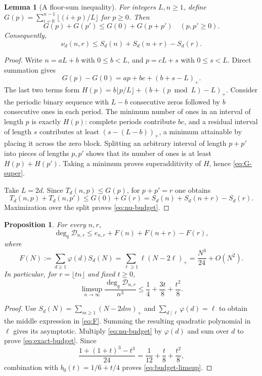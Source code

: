 \documentclass[11pt]{article}
\numberwithin{equation}{section}
\newtheorem{proposition}[proposition]{Proposition}
\newtheorem{lemma}[lemma]{Lemma}
\theoremstyle{definition}
\theoremstyle{remark}
\newcommand{\degq}{\operatorname{deg}_q}
\newcommand{\DD}{\mathcal{D}}
\begin{document}
\begin{lemma}[A floor-sum inequality]\label{lem:floor}
For integers $L,n\ge1$, define $G(p)=\sum_{i=0}^{n-1}\lfloor(i+p)/L\rfloor$
for $p\ge0$. Then
\begin{equation}\label{eq:G-super}
 G(p)+G(p')\le G(0)+G(p+p')\quad(p,p'\ge0).
\end{equation}
Consequently,
\begin{equation}\label{eq:nu-budget}
 \nu_d(n,r)\le S_d(n)+S_d(n+r)-S_d(r).
\end{equation}
\end{lemma}
\begin{proof}
Write $n=aL+b$ with $0\le b<L$, and $p=cL+s$ with $0\le s<L$.
Direct summation gives
\[
 G(p)-G(0)=ap+bc+(b+s-L)_+.
\]
The last two terms form
$H(p)=b\lfloor p/L\rfloor+(b+(p\bmod L)-L)_+$.
Consider the periodic binary sequence with $L-b$ consecutive zeros followed
by $b$ consecutive ones in each period. The minimum number of ones in an
interval of length $p$ is exactly $H(p)$: complete periods contribute $bc$,
and a residual interval of length $s$ contributes at least
$(s-(L-b))_+$, a minimum attainable by placing it across the zero block.
Splitting an arbitrary interval of length $p+p'$ into pieces of lengths
$p,p'$ shows that its number of ones is at least $H(p)+H(p')$.
Taking a minimum proves superadditivity of $H$, hence \eqref{eq:G-super}.

Take $L=2d$. Since $T_d(n,p)\le G(p)$, for $p+p'=r$ one obtains
\[
 T_d(n,p)+T_d(n,p')\le G(0)+G(r)
 =S_d(n)+S_d(n+r)-S_d(r).
\]
Maximization over the split proves \eqref{eq:nu-budget}.
\end{proof}

\begin{proposition}\label{prop:budget}
For every $n,r$,
\begin{equation}\label{eq:exact-budget}
 \degq\DD_{n,r}\le e_{n,r}+F(n)+F(n+r)-F(r),
\end{equation}
where
\begin{equation}\label{eq:F}
 F(N):=\sum_{d\ge1}\varphi(d)S_d(N)
 =\sum_{\ell\ge1}\ell(N-2\ell)_+
 =\frac{N^3}{24}+O(N^2).
\end{equation}
In particular, for $r=\lfloor tn\rfloor$ and fixed $t\ge0$,
\begin{equation}\label{eq:budget-limsup}
 \limsup_{n\to\infty}\frac{\degq\DD_{n,r}}{n^3}
 \le\frac14+\frac{3t}{8}+\frac{t^2}{8}.
\end{equation}
\end{proposition}
\begin{proof}
Use $S_d(N)=\sum_{m\ge1}(N-2dm)_+$ and
$\sum_{d\mid\ell}\varphi(d)=\ell$ to obtain the middle expression in
\eqref{eq:F}. Summing the resulting quadratic polynomial in $\ell$ gives its
asymptotic. Multiply \eqref{eq:nu-budget} by $\varphi(d)$ and sum over $d$
to prove \eqref{eq:exact-budget}. Since
\[
 \frac{1+(1+t)^3-t^3}{24}
 =\frac1{12}+\frac t8+\frac{t^2}{8},
\]
combination with $b_0(t)=1/6+t/4$ proves \eqref{eq:budget-limsup}.
\end{proof}
\end{document}

